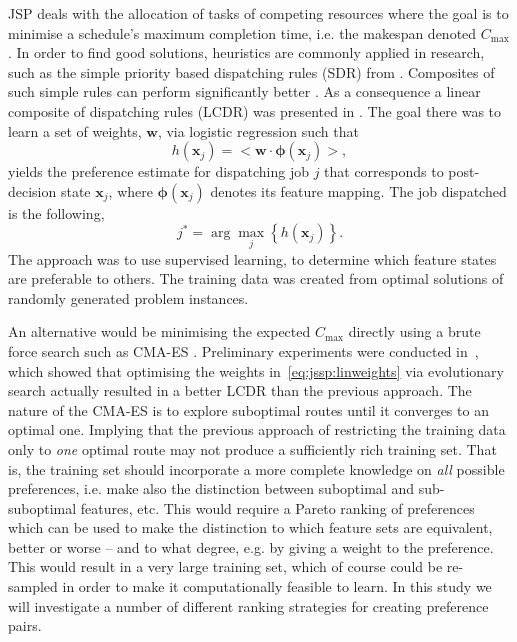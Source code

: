 \documentclass[letterpaper]{article}
\newcommand{\vphi}{{\boldsymbol{\phi}}}
\renewcommand{\vec}[1]{\mathbf{#1}}
\begin{document}
JSP deals with the allocation of tasks of competing resources where the goal is to minimise a schedule's maximum completion time, i.e. the makespan denoted $C_{\max}$. In order to find good solutions, heuristics are commonly applied in research, such as the simple priority based dispatching rules (SDR) from \cite{Panwalkar77}. Composites of such simple rules can perform significantly better 
\cite{Jayamohan04}. As a consequence a linear composite of dispatching rules (LCDR) was presented  in 
. The goal there was to learn a set of weights, $\vec{w}$, via logistic regression such that 
\begin{equation}\label{eq:jssp:linweights}
h(\vec{x}_j)=\big<{\vec{w}}\cdot{\vphi(\vec{x}_j)}\big>,
\end{equation}
yields the preference estimate for dispatching job $j$ that corresponds to post-decision state $\vec{x}_j$, where $\vphi(\vec{x}_j)$ denotes its feature mapping. The job dispatched is the following, 
\begin{equation}\label{eq:jstar}
j^* = \arg\max_j\left\{h(\vec{x}_j)\right\}. 
\end{equation}
The approach was to use supervised learning, to determine which feature states are preferable to others. 
The training data was created from optimal solutions of randomly generated problem instances. 












An alternative would be minimising the expected $C_{\max}$ directly using a brute force search such as CMA-ES \cite{Hansen01}. Preliminary experiments were conducted in~, which showed that optimising the weights in~\cref{eq:jssp:linweights} via evolutionary search actually resulted in a better LCDR than the previous approach. The nature of the CMA-ES is to explore suboptimal routes until it converges to an optimal one. Implying that the previous approach of restricting the training data only to \emph{one} optimal route may not produce a sufficiently rich training set. That is, the training set should incorporate a more complete knowledge on \emph{all} possible preferences, i.e. make also the distinction between suboptimal and sub-suboptimal features, etc.  This would require a Pareto ranking of preferences which can be used to make the distinction to which feature sets are equivalent, better or worse -- and to what degree, e.g. by giving a weight to the preference. This would result in a very large training set, which of course could be re-sampled in order to make it computationally feasible to learn. In this study we will investigate a number of different ranking strategies for creating preference pairs.
\end{document}
